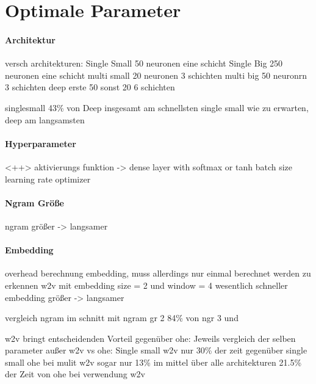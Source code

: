 \iffalse
    \section{Optimale Parameter}

            \paragraph{Architektur}
                versch architekturen:
                Single Small 50 neuronen eine schicht
                Single Big 250 neuronen eine schicht
                multi small 20 neuronen 3 schichten
                multi big 50 neuronrn 3 schichten
                deep erste 50 sonst 20 6 schichten

                singlesmall 43\% von Deep
                insgesamt am schnellsten single small
                wie zu erwarten,  deep am langsamsten

            \paragraph{Hyperparameter}<++>
                aktivierungs funktion
                -> dense layer with softmax or tanh
                batch size
                learning rate
                optimizer

            \paragraph{Ngram Größe}
                ngram größer -> langsamer

            \paragraph{Embedding}

                overhead berechnung embedding, muss allerdings nur einmal berechnet werden
                zu erkennen w2v mit embedding size = 2  und window = 4 wesentlich schneller
                embedding größer -> langsamer

                vergleich ngram
                im schnitt mit ngram gr 2 84\% von ngr 3 und 

                w2v bringt entscheidenden Vorteil gegenüber ohe:
                Jeweils vergleich der selben parameter außer w2v vs ohe:
                Single small w2v nur 30\% der zeit gegenüber single small ohe
                bei mulit w2v sogar nur 13\%
                im mittel über alle architekturen 21.5\% der Zeit von ohe bei verwendung w2v

